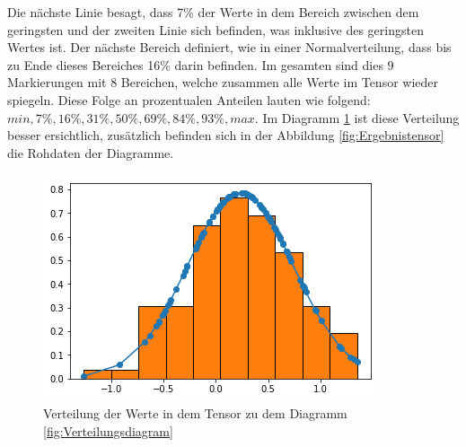 Die nächste Linie besagt, dass 7\% der Werte in dem Bereich zwischen dem geringsten und der zweiten Linie sich befinden, was inklusive des geringsten Wertes ist.  
Der nächste Bereich definiert, wie in einer Normalverteilung, dass bis zu Ende dieses Bereiches 16\% darin befinden. 
Im gesamten sind dies $9$ Markierungen mit 8 Bereichen, welche zusammen alle Werte im Tensor wieder spiegeln. 
Diese Folge an prozentualen Anteilen lauten wie folgend: $min, 7\%, 16\%, 31\%, 50\%, 69\%, 84\%, 93\%, max$. 
Im Diagramm \ref{fig:VerteilungsdiagrammPython} ist diese Verteilung besser ersichtlich, zusätzlich befinden sich in der Abbildung \ref{fig:Ergebnistensor} die Rohdaten der Diagramme. 
\begin{figure}
	\centering
	\includegraphics[scale=0.6]{images/gaussian.png}
	\caption{Verteilung der Werte in dem Tensor zu dem Diagramm \ref{fig:Verteilungsdiagram}}
	\label{fig:VerteilungsdiagrammPython}
\end{figure}
